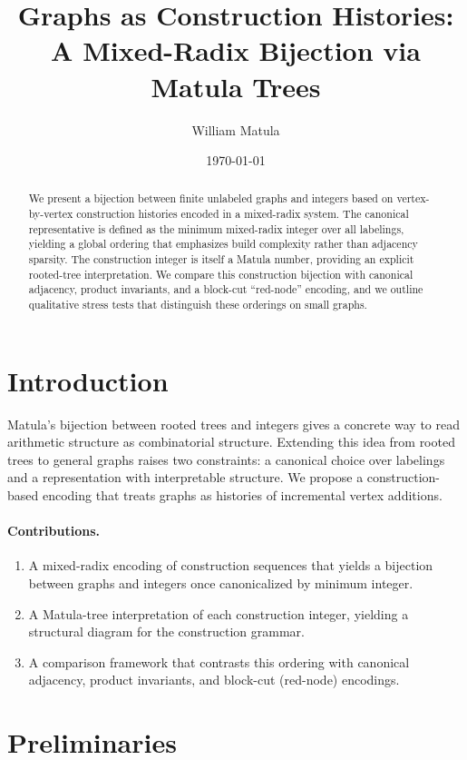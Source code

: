 \documentclass[11pt]{article}
\title{Graphs as Construction Histories: A Mixed-Radix Bijection via Matula Trees}
\author{William Matula}
\date{\today}
\begin{document}
\maketitle

\begin{abstract}
We present a bijection between finite unlabeled graphs and integers based on
vertex-by-vertex construction histories encoded in a mixed-radix system. The
canonical representative is defined as the minimum mixed-radix integer over all
labelings, yielding a global ordering that emphasizes build complexity rather
than adjacency sparsity. The construction integer is itself a Matula number,
providing an explicit rooted-tree interpretation. We compare this construction
bijection with canonical adjacency, product invariants, and a block-cut
``red-node'' encoding, and we outline qualitative stress tests that distinguish
these orderings on small graphs.
\end{abstract}

\section{Introduction}
Matula's bijection between rooted trees and integers gives a concrete way to
read arithmetic structure as combinatorial structure. Extending this idea from
rooted trees to general graphs raises two constraints: a canonical choice over
labelings and a representation with interpretable structure. We propose a
construction-based encoding that treats graphs as histories of incremental
vertex additions.

\paragraph{Contributions.}
\begin{enumerate}[label=\arabic*.]
    \item A mixed-radix encoding of construction sequences that yields a bijection
    between graphs and integers once canonicalized by minimum integer.
    \item A Matula-tree interpretation of each construction integer, yielding a
    structural diagram for the construction grammar.
    \item A comparison framework that contrasts this ordering with canonical
    adjacency, product invariants, and block-cut (red-node) encodings.
\end{enumerate}

\section{Preliminaries}
\end{document}
